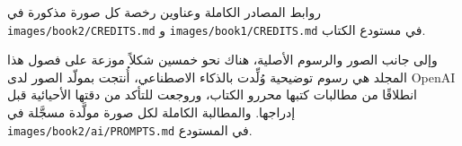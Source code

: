 روابط المصادر الكاملة وعناوين رخصة كل صورة مذكورة في
\texttt{images/\allowbreak book2/\allowbreak CREDITS.md} و \texttt{images/\allowbreak book1/\allowbreak CREDITS.md}
في مستودع الكتاب.

\bigskip
وإلى جانب الصور والرسوم الأصلية، هناك نحو خمسين شكلاً موزعة على فصول
هذا المجلد هي رسوم توضيحية وُلِّدت بالذكاء الاصطناعي، أُنتجت بمولّد الصور
لدى OpenAI انطلاقًا من مطالبات كتبها محررو الكتاب، وروجعت للتأكد من
دقتها الأحيائية قبل إدراجها. والمطالبة الكاملة لكل صورة مولَّدة مسجَّلة في
\texttt{images/\allowbreak book2/\allowbreak ai/\allowbreak PROMPTS.md} في المستودع.
\par\endgroup
\clearpage

